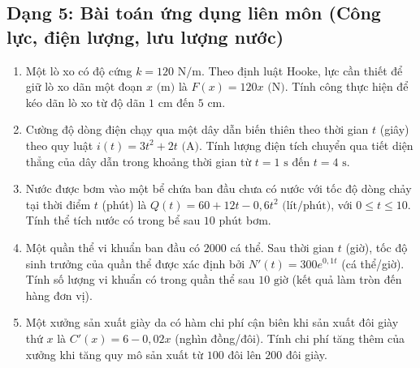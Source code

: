 \documentclass[12pt]{article}
\begin{document}
	\subsection{Dạng 5: Bài toán ứng dụng liên môn (Công lực, điện lượng, lưu lượng nước)}
	\begin{btxanh}
		\begin{enumerate}[label=\textbf{Bài \arabic*.}]
			\item Một lò xo có độ cứng $k = 120\text{ N/m}$. Theo định luật Hooke, lực cần thiết để giữ lò xo dãn một đoạn $x\text{ (m)}$ là $F(x) = 120x\text{ (N)}$. Tính công thực hiện để kéo dãn lò xo từ độ dãn $1\text{ cm}$ đến $5\text{ cm}$.
			\item Cường độ dòng điện chạy qua một dây dẫn biến thiên theo thời gian $t$ (giây) theo quy luật $i(t) = 3t^2 + 2t\text{ (A)}$. Tính lượng điện tích chuyển qua tiết diện thẳng của dây dẫn trong khoảng thời gian từ $t = 1\text{ s}$ đến $t = 4\text{ s}$.
			\item Nước được bơm vào một bể chứa ban đầu chưa có nước với tốc độ dòng chảy tại thời điểm $t$ (phút) là $Q(t) = 60 + 12t - 0{,}6t^2\text{ (lít/phút)}$, với $0 \le t \le 10$. Tính thể tích nước có trong bể sau $10\text{ phút}$ bơm.
			\item Một quần thể vi khuẩn ban đầu có $2000$ cá thể. Sau thời gian $t$ (giờ), tốc độ sinh trưởng của quần thể được xác định bởi $N'(t) = 300 e^{0{,}1t}$ (cá thể/giờ). Tính số lượng vi khuẩn có trong quần thể sau $10\text{ giờ}$ (kết quả làm tròn đến hàng đơn vị).
			\item Một xưởng sản xuất giày da có hàm chi phí cận biên khi sản xuất đôi giày thứ $x$ là $C'(x) = 6 - 0{,}02x$ (nghìn đồng/đôi). Tính chi phí tăng thêm của xưởng khi tăng quy mô sản xuất từ $100$ đôi lên $200$ đôi giày.
		\end{enumerate}
	\end{btxanh}
	
\end{document}
